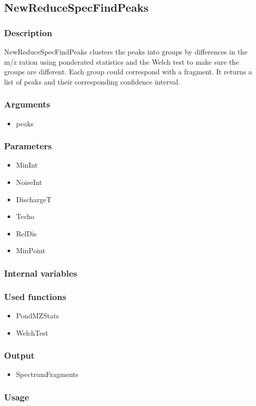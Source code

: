 \subsection{NewReduceSpecFindPeaks}
\subsubsection{Description}

NewReduceSpecFindPeaks clusters the peaks into groups by differences in the m/z ration using ponderated statistics and the Welch test to make sure the groups are different. Each group could correspond with a fragment. It returns a list of peaks and their corresponding confidence interval.

\subsubsection{Arguments}
\begin{itemize}
\item peaks
\end{itemize}
\subsubsection{Parameters}
\begin{itemize}
\item MinInt
\item NoiseInt
\item DischargeT
\item Techo
\item RelDis
\item MinPoint
\end{itemize}
\subsubsection{Internal variables}
\subsubsection{Used functions}
\begin{itemize}
\item PondMZStats
\item WelchTest
\end{itemize}
\subsubsection{Output}
\begin{itemize}
\item SpectrumFragments %
\end{itemize}

\subsubsection{Usage}

